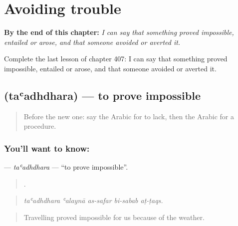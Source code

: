 
\chapter{Avoiding trouble}
\label{ch:ar-avoiding-trouble}

\begin{chapteropening}
\textbf{By the end of this chapter:} \emph{I can say that something proved impossible, entailed or arose, and that someone avoided or averted it.}

Complete the last lesson of chapter 407: I can say that something proved impossible, entailed or arose, and that someone avoided or averted it.
\end{chapteropening}

\section[\texorpdfstring{\ar{تعذر} (taʿadhdhara)}{تعذر (taʿadhdhara)}]{ (taʿadhdhara) — to prove impossible}

\label{lesson:AR-C407-taadhdhara}



\begin{quote}
Before the new one: say the Arabic for to lack, then the Arabic for a procedure.
\end{quote}

\subsection*{You'll want to know: }
\textbf{} — \emph{taʿadhdhara} — \textquotedblleft{}to prove impossible\textquotedblright{}.

\begin{quote}
    .
\end{quote}

\begin{quote}
\emph{taʿadhdhara ʿalaynā as-safar bi-sabab aṭ-ṭaqs.}
\end{quote}

\begin{quote}
Travelling proved impossible for us because of the weather.
\end{quote}

